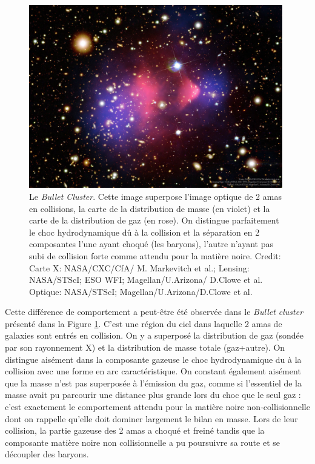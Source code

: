 \begin{figure}[htbp]
	\centering
		\includegraphics[height=8cm]{figs/bullet.jpg}
	\caption{Le \textit{Bullet Cluster}. Cette image superpose l'image optique de 2 amas en collisions, la carte de la distribution de masse (en violet) et la carte de la distribution de gaz (en rose). On distingue parfaitement le choc hydrodynamique dû à la collision et la séparation en 2 composantes l'une ayant choqué (les baryons), l'autre n'ayant pas subi de collision forte comme attendu pour la matière noire.
Credit: Carte X: NASA/CXC/CfA/ M. Markevitch et al.;  Lensing: NASA/STScI; ESO WFI; Magellan/U.Arizona/ D.Clowe et al. Optique: NASA/STScI; Magellan/U.Arizona/D.Clowe et al.} 
	\label{f:bullet}
\end{figure}

Cette différence de comportement a peut-être été observée dans le \textit{Bullet cluster} présenté dans la Figure \ref{f:bullet}. C'est une région du ciel dans laquelle 2 amas de galaxies sont entrés en collision. On y a superposé la distribution de gaz (sondée par son rayonnement X) et la distribution de masse totale (gaz+autre). On distingue aisément dans la composante gazeuse le choc hydrodynamique du à la collision avec une forme en arc caractéristique. On constant également aisément que la masse n'est pas superposée à l'émission du gaz, comme si l'essentiel de la masse avait pu parcourir une distance plus grande lors du choc que le seul gaz : c'est exactement le comportement attendu pour la matière noire non-collisionnelle dont on rappelle qu'elle doit dominer largement le bilan en masse. Lors de leur collision, la partie gazeuse des 2 amas a choqué et freiné tandis que la composante matière noire non collisionnelle a pu poursuivre sa route et se découpler des baryons. 

